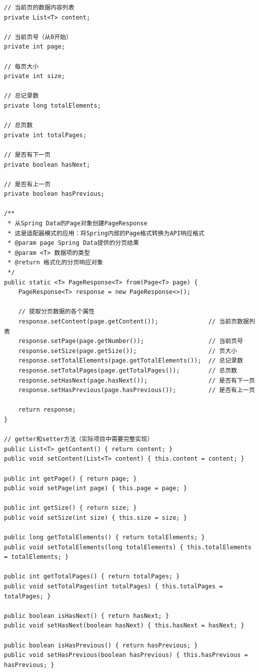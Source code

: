 \begin{verbatim}
// 当前页的数据内容列表
private List<T> content;

// 当前页号（从0开始）
private int page;

// 每页大小
private int size;

// 总记录数
private long totalElements;

// 总页数
private int totalPages;

// 是否有下一页
private boolean hasNext;

// 是否有上一页
private boolean hasPrevious;

/**
 * 从Spring Data的Page对象创建PageResponse
 * 这是适配器模式的应用：将Spring内部的Page格式转换为API响应格式
 * @param page Spring Data提供的分页结果
 * @param <T> 数据项的类型
 * @return 格式化的分页响应对象
 */
public static <T> PageResponse<T> from(Page<T> page) {
    PageResponse<T> response = new PageResponse<>();
    
    // 提取分页数据的各个属性
    response.setContent(page.getContent());              // 当前页数据列表
    response.setPage(page.getNumber());                  // 当前页号
    response.setSize(page.getSize());                    // 页大小
    response.setTotalElements(page.getTotalElements());  // 总记录数
    response.setTotalPages(page.getTotalPages());        // 总页数
    response.setHasNext(page.hasNext());                 // 是否有下一页
    response.setHasPrevious(page.hasPrevious());         // 是否有上一页
    
    return response;
}

// getter和setter方法（实际项目中需要完整实现）
public List<T> getContent() { return content; }
public void setContent(List<T> content) { this.content = content; }

public int getPage() { return page; }
public void setPage(int page) { this.page = page; }

public int getSize() { return size; }
public void setSize(int size) { this.size = size; }

public long getTotalElements() { return totalElements; }
public void setTotalElements(long totalElements) { this.totalElements = totalElements; }

public int getTotalPages() { return totalPages; }
public void setTotalPages(int totalPages) { this.totalPages = totalPages; }

public boolean isHasNext() { return hasNext; }
public void setHasNext(boolean hasNext) { this.hasNext = hasNext; }

public boolean isHasPrevious() { return hasPrevious; }
public void setHasPrevious(boolean hasPrevious) { this.hasPrevious = hasPrevious; }
\end{verbatim}

